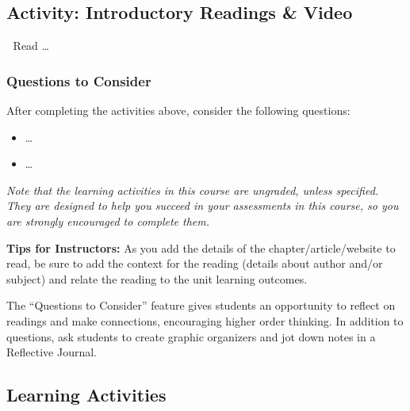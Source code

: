 \documentclass[
]{book}
\providecommand{\tightlist}{%
  \setlength{\itemsep}{0pt}\setlength{\parskip}{0pt}}
\begin{document}
\hypertarget{activity-introductory-readings-video}{%
\subsection*{Activity: Introductory Readings \& Video}\label{activity-introductory-readings-video}}

\begin{reflect}
📗 Read \ldots{}

\hypertarget{questions-to-consider}{%
\subsubsection*{Questions to Consider}\label{questions-to-consider}}

After completing the activities above, consider the following questions:

\begin{itemize}
\tightlist
\item
  \ldots{}\\
\item
  \ldots{}
\end{itemize}
\end{reflect}

\emph{Note that the learning activities in this course are ungraded, unless specified. They are designed to help you succeed in your assessments in this course, so you are strongly encouraged to complete them.}

\begin{feedback}
\textbf{Tips for Instructors:}
As you add the details of the chapter/article/website to read, be sure to add the context for the reading (details about author and/or subject) and relate the reading to the unit learning outcomes.

The ``Questions to Consider'' feature gives students an opportunity to reflect on readings and make connections, encouraging higher order thinking. In addition to questions, ask students to create graphic organizers and jot down notes in a Reflective Journal.
\end{feedback}

\hypertarget{learning-activities-5}{%
\subsection*{Learning Activities}\label{learning-activities-5}}
\end{document}
